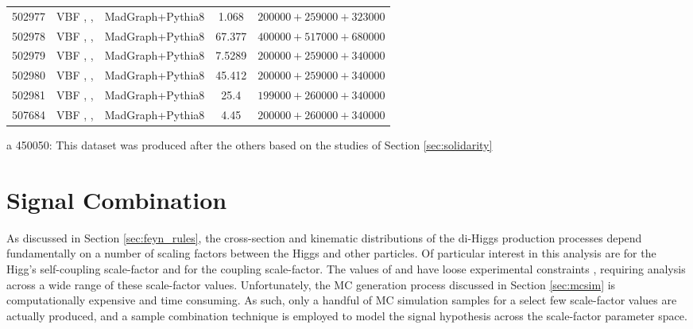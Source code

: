 \begin{table}[tbh]
\begin{center}
\begin{tabular}{l l l S l}
               502977  &	VBF , ,     &  MadGraph+Pythia8 &	1.068   & $200000  +259000  +323000  $\\
               502978  &	VBF , ,    &  MadGraph+Pythia8 &	67.377  & $400000  +517000  +680000  $\\
               502979  &	VBF , ,   &  MadGraph+Pythia8 &	7.5289  & $200000  +259000  +340000  $\\
               502980  &	VBF , ,   &  MadGraph+Pythia8 &	45.412  & $200000  +259000  +340000  $\\
               502981  &	VBF , ,     &  MadGraph+Pythia8 &	25.4    & $199000  +260000  +340000  $\\
               507684  &	VBF , ,  &  MadGraph+Pythia8 &	4.45    & $200000  +260000  +340000  $\\
           \bottomrule
           \end{tabular}
           \begin{tablenotes}
            \item[a] 450050: This dataset was produced after the others based on the studies of Section \ref{sec:solidarity}
          \end{tablenotes}
       \end{center}
    \end{table}



\FloatBarrier
\section{Signal Combination} \label{sec:signal_combination}

    As discussed in Section \ref{sec:feyn_rules},
        the cross-section and kinematic distributions of the di-Higgs production processes
        depend fundamentally on a number of scaling factors between the Higgs and other particles.
    Of particular interest in this analysis are \kl for the Higg's self-coupling scale-factor and \kvv for the \HHVV coupling scale-factor.
    The values of \kl and \kvv have loose experimental constraints \cite{EXOT-2016-31} \cite{HDBS-2018-18-witherratum} \cite{ATLAS-CONF-2019-049},
        requiring analysis across a wide range of these scale-factor values.
    Unfortunately, the MC generation process discussed in Section \ref{sec:mcsim} is computationally expensive and time consuming.
    As such, only a handful of MC simulation samples for a select few scale-factor values are actually produced,
        and a sample combination technique is employed to model the signal hypothesis across the scale-factor parameter space.

